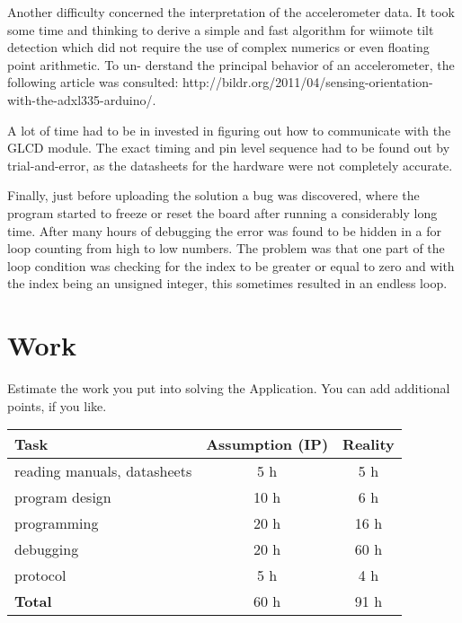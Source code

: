 \documentclass[12pt,a4paper,titlepage,oneside]{article}
\begin{document}
Another difficulty concerned the interpretation of the accelerometer data. It took some
time and thinking to derive a simple and fast algorithm for wiimote tilt detection which
did not require the use of complex numerics or even floating point arithmetic. To un-
derstand the principal behavior of an accelerometer, the following article was consulted:
http://bildr.org/2011/04/sensing-orientation-with-the-adxl335-arduino/.

A lot of time had to be in invested in figuring out how to communicate with the GLCD
module. The exact timing and pin level sequence had to be found out by trial-and-error, as the
datasheets for the hardware were not completely accurate.

Finally, just before uploading the solution a bug was discovered, where the program started to
freeze or reset the board after running a considerably long time. After many hours of debugging
the error was found to be hidden in a for loop counting from high to low numbers. The problem
was that one part of the loop condition was checking for the index to be greater or equal to
zero and with the index being an unsigned integer, this sometimes resulted in an endless loop.

\section{Work}

Estimate the work you put into solving the Application.
You can add additional points, if you like.

\begin{tabular}{|l|c|c|}\hline
	Task & Assumption (IP) & Reality \\ \hline

	reading manuals, datasheets &  5 h &  5 h\\
	program design              & 10 h &  6 h\\
	programming                 & 20 h & 16 h\\
	debugging                   & 20 h & 60 h\\
	protocol                    & 5  h &  4 h\\ \hline

	\textbf{Total}              & 60 h & 91 h\\ \hline
\end{tabular}


\newpage
\end{document}
